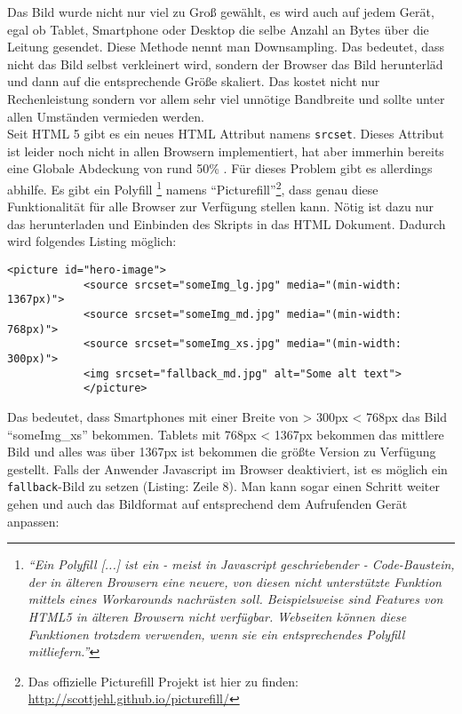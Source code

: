 			Das Bild wurde nicht nur viel zu Groß gewählt, es wird auch auf jedem Gerät, egal ob Tablet, Smartphone oder Desktop die selbe Anzahl an Bytes über die Leitung gesendet. Diese Methode nennt man Downsampling. Das bedeutet, dass nicht das Bild selbst verkleinert wird, sondern der Browser das Bild herunterläd und dann auf die entsprechende Größe skaliert. Das kostet nicht nur Rechenleistung sondern vor allem sehr viel unnötige Bandbreite und sollte unter allen Umständen vermieden werden.\\

			Seit HTML 5 gibt es ein neues HTML Attribut namens \texttt{srcset}. Dieses Attribut ist leider noch nicht in allen Browsern implementiert, hat aber immerhin bereits eine Globale Abdeckung von rund 50\% \autocite{canIuse}. Für dieses Problem gibt es allerdings abhilfe. Es gibt ein Polyfill \footnote{\textit{"`Ein Polyfill [...] ist ein - meist in Javascript geschriebender - Code-Baustein, der in älteren Browsern eine neuere, von diesen nicht unterstützte Funktion mittels eines Workarounds nachrüsten soll. Beispielsweise sind Features von HTML5 in älteren Browsern nicht verfügbar. Webseiten können diese Funktionen trotzdem verwenden, wenn sie ein entsprechendes Polyfill mitliefern."'}\autocite{wikipediaPolyfill}} namens "`Picturefill"'\footnote{Das offizielle Picturefill Projekt ist hier zu finden: \url{http://scottjehl.github.io/picturefill/}}, dass genau diese Funktionalität für alle Browser zur Verfügung stellen kann. Nötig ist dazu nur das herunterladen und Einbinden des Skripts in das HTML Dokument. Dadurch wird folgendes Listing möglich: 

			\begin{lstlisting}[captionpos=b, caption=Srcset in Verwendung, label=lst:srcset]
			<picture id="hero-image">
		    <source srcset="someImg_lg.jpg" media="(min-width: 1367px)">
		    <source srcset="someImg_md.jpg" media="(min-width: 768px)">
		    <source srcset="someImg_xs.jpg" media="(min-width: 300px)">
		    <img srcset="fallback_md.jpg" alt="Some alt text">
			</picture>
			\end{lstlisting}

			Das bedeutet, dass Smartphones mit einer Breite von > 300px < 768px das Bild "`someImg\_xs"' bekommen. Tablets mit 768px < 1367px bekommen das mittlere Bild und alles was über 1367px ist bekommen die größte Version zu Verfügung gestellt. Falls der Anwender Javascript im Browser deaktiviert, ist es möglich ein \texttt{fallback}-Bild zu setzen (Listing: Zeile 8). Man kann sogar einen Schritt weiter gehen und auch das Bildformat auf entsprechend dem Aufrufenden Gerät anpassen:

